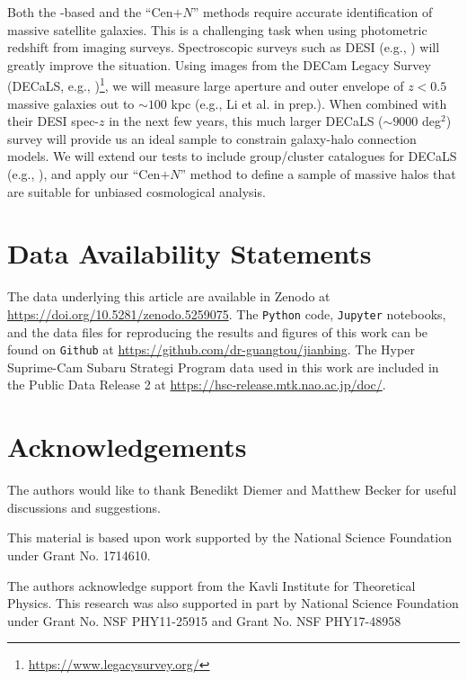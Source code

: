 \documentclass[fleqn,usenatbib,useAMS]{mnras}
\begin{document}
\begin{CJK*}{UTF8}{gbsn}
    Both the \mstar{}-based and the ``Cen$+N$'' methods require accurate identification of massive
    satellite galaxies.
    This is a challenging task when using photometric redshift from imaging surveys.  Spectroscopic
    surveys such as DESI (e.g., \citealt{DESI2016}) will greatly improve the situation.
    Using images from the DECam Legacy Survey (DECaLS, e.g., \citealt{Dey2019})\footnote{
        \url{https://www.legacysurvey.org/}
    }, we will measure large aperture and outer envelope \mstar{} of $z<0.5$ massive galaxies 
    out to $\sim 100$ kpc (e.g., Li et al. in prep.).
    When combined with their DESI spec-$z$ in the next few years, this much larger DECaLS ($\sim
    9000$ deg$^2$) survey will provide us an ideal sample to constrain galaxy-halo connection
    models.
    We will extend our \topn{} tests to include group/cluster catalogues for DECaLS (e.g.,
    \citealt{Yang2020, Zou2021}), and apply our ``Cen$+N$'' method to define a sample of massive
    halos that are suitable for unbiased cosmological analysis.
    
\section*{Data Availability Statements}

    The data underlying this article are available in Zenodo at 
    \url{https://doi.org/10.5281/zenodo.5259075}.
    The \texttt{Python} code, \texttt{Jupyter} notebooks, and the data files for reproducing the 
    results and figures of this work can be found on \texttt{Github} at
    \url{https://github.com/dr-guangtou/jianbing}.
    The Hyper Suprime-Cam Subaru Strategi Program data used in this work are included in the 
    Public Data Release 2 at \url{https://hsc-release.mtk.nao.ac.jp/doc/}.

\section*{Acknowledgements}

  The authors would like to thank Benedikt Diemer and Matthew Becker for useful discussions and 
  suggestions.

  This material is based upon work supported by the National Science Foundation under
  Grant No. 1714610.

  The authors acknowledge support from the Kavli Institute for Theoretical Physics.
  This research was also supported in part by National Science Foundation under Grant
  No. NSF PHY11-25915 and Grant No. NSF PHY17-48958


\end{CJK*}
\end{document}
